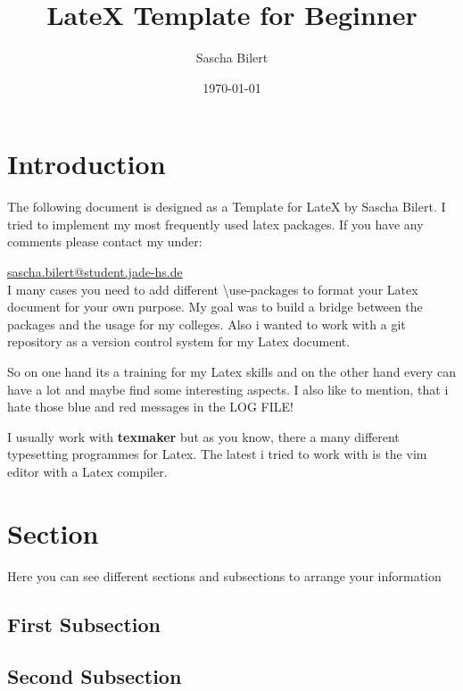 \documentclass[11pt, a4paper]{article}
\begin{document}
\title{LateX Template for Beginner}
\author{Sascha Bilert}
\date{\today}
\maketitle
\thispagestyle{empty}
\tableofcontents

\pagebreak


\section{Introduction}

The following document is designed as a Template for LateX by Sascha Bilert. I tried to implement my most frequently used latex packages. If you have any comments please contact my under:

\href{mailto:sascha.bilert@student.jade-hs.de}{sascha.bilert@student.jade-hs.de}\\
I many cases you need to add different \textbackslash use-packages to format your Latex document for your own purpose. My goal was to build a bridge between the packages and the usage for my colleges. Also i wanted to work with a git repository as a version control system for my Latex document.

So on one hand its a training for my Latex skills and on the other hand every can have a lot and maybe find some interesting aspects. I also like to mention, that i hate those {\color{blue}blue} and {\color{red}red} messages in the LOG FILE!

I usually work with \textbf{texmaker} but as you know, there a many different typesetting programmes for Latex. The latest i tried to work with is the vim editor with a Latex compiler.

\section{Section}

Here you can see different sections and subsections to arrange your information

\subsection{First Subsection}

\subsection{Second Subsection}
\end{document}

